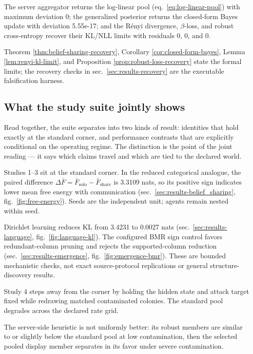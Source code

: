 \documentclass[
  english,
]{article}
\theoremstyle{plain}
\theoremstyle{definition}
\theoremstyle{remark}
\theoremstyle{definition}
\begin{document}
The server aggregator returns the log-linear pool
(eq.~\ref{eq:log-linear-pool}) with maximum deviation 0; the generalized
posterior returns the closed-form Bayes update with deviation 5.55e-17;
and the Rényi divergence, \(\beta\)-loss, and robust cross-entropy
recover their KL/NLL limits with residuals 0, 0, and 0.

Theorem \ref{thm:belief-sharing-recovery}, Corollary
\ref{cor:closed-form-bayes}, Lemma \ref{lem:renyi-kl-limit}, and
Proposition \ref{prop:robust-loss-recovery} state the formal limits; the
recovery checks in sec.~\ref{sec:results-recovery} are the executable
falsification harness.

\subsection{What the study suite jointly
shows}\label{sec:discussion-joint}

Read together, the suite separates into two kinds of result: identities
that hold exactly at the standard corner, and performance contrasts that
are explicitly conditional on the operating regime. The distinction is
the point of the joint reading --- it says which claims travel and which
are tied to the declared world.

Studies 1--3 sit at the standard corner. In the reduced categorical
analogue, the paired difference
\(\Delta \bar F=\bar F_{\text{solo}}-\bar F_{\text{share}}\) is 3.3109
nats, so its positive sign indicates lower mean free energy with
communication (sec.~\ref{sec:results-belief_sharing},
fig.~\ref{fig:free-energy}). Seeds are the independent unit; agents
remain nested within seed.

Dirichlet learning reduces KL from 3.4231 to 0.0027 nats
(sec.~\ref{sec:results-language}, fig.~\ref{fig:language-kl}). The
configured BMR sign control favors redundant-column pruning and rejects
the supported-column reduction (sec.~\ref{sec:results-emergence},
fig.~\ref{fig:emergence-bmr}). These are bounded mechanistic checks, not
exact source-protocol replications or general structure-discovery
results.

Study 4 steps away from the corner by holding the hidden state and
attack target fixed while redrawing matched contaminated colonies. The
standard pool degrades across the declared rate grid.

The server-side heuristic is not uniformly better: its robust members
are similar to or slightly below the standard pool at low contamination,
then the selected pooled display member separates in its favor under
severe contamination.
\end{document}
